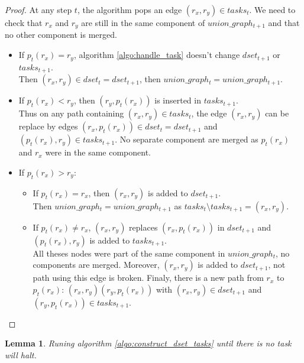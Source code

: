 \documentclass[12px]{article}
\newtheorem{lemma}[theorem]{Lemma}
\begin{document}
    \begin{proof}
      At any step $t$, the algorithm pops an edge $(r_x, r_y) \in tasks_t$. We need to check that $r_x$ and $r_y$ are still in the same component of $union\_graph_{t+1}$ and that no other component is merged.
      \begin{itemize}
        \item If $p_t(r_x) = r_y$, algorithm \ref{algo:handle_task} doesn't change $dset_{t+1}$ or $tasks_{t+1}$. \\
          Then $(r_x, r_y) \in dset_t = dset_{t+1}$, then $union\_graph_t = union\_graph_{t+1}$.

        \item If $p_t(r_x) < r_y$, then $(r_y, p_t(r_x))$ is inserted in $tasks_{t+1}$. \\
          Thus on any path containing $(r_x, r_y) \in tasks_t$, the edge $(r_x, r_y)$ can be replace by edges $(r_x, p_t(r_x)) \in dset_t = dset_{t+1}$ and $(p_t(r_x), r_y) \in tasks_{t+1}$. No separate component are merged as $p_t(r_x)$ and $r_x$ were in the same component.

        \item If $p_t(r_x) > r_y$:
        \begin{itemize}
          \item If $p_t(r_x) = r_x$, then $(r_x, r_y)$ is added to $dset_{t+1}$. \\
            Then $union\_graph_t = union\_graph_{t+1}$ as $tasks_t \setminus tasks_{t+1} = {(r_x, r_y)}$.
          \item If $p_t(r_x) \neq r_x$, $(r_x, r_y)$ replaces $(r_x, p_t(r_x))$ in $dset_{t+1}$ and $(p_t(r_x), r_y)$ is added to $tasks_{t+1}$. \\
            All theses nodes were part of the same component in $union\_graph_t$, no components are merged. Moreover, $(r_x, r_y)$ is added to $dset_{t+1}$, not path using this edge is broken. Finaly, there is a new path from $r_x$ to $p_t(r_x)$: $(r_x, r_y)(r_y, p_t(r_x))$ with $(r_x, r_y) \in dset_{t+1}$ and $(r_y, p_t(r_x)) \in tasks_{t+1}$.
        \end{itemize}
      \end{itemize}
    \end{proof}

    \begin{lemma}
      \label{lemma:halt}
      Runing algorithm \ref{algo:construct_dset_tasks} until there is no task will halt.
    \end{lemma}
\end{document}
